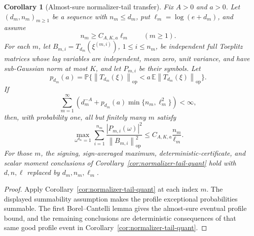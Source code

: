 \documentclass[11pt]{amsart}
\numberwithin{equation}{section}
\newtheorem{corollary}[theorem]{Corollary}
\theoremstyle{definition}
\theoremstyle{remark}
\newcommand{\op}{\mathrm{op}}
\newcommand{\Prob}{\mathbb P}
\newcommand{\Exp}{\mathbb E}
\newcommand{\norm}[1]{\left\lVert #1\right\rVert}
\newcommand{\abs}[1]{\left\lvert #1\right\rvert}
\begin{document}
\begin{corollary}[Almost-sure normalizer-tail transfer]
\label{cor:normalizer-tail-borel}
Fix \(A>0\) and \(a>0\).  Let \((d_m,n_m)_{m\ge1}\) be a sequence with
\(n_m\le d_m\), put \(\ell_m=\log(e+d_m)\), and assume
\[
  n_m\ge C_{A,K,a}\ell_m
  \qquad(m\ge1).
\]
For each \(m\), let \(B_{m,i}=T_{d_m}(\xi^{(m,i)})\), \(1\le i\le n_m\), be
independent full Toeplitz matrices whose lag variables are independent, mean
zero, unit variance, and have sub-Gaussian norm at most \(K\), and let
\(P_{m,i}\) be their symbols.  Let
\[
  p_{d_m}(a)
  =\Prob\{\norm{T_{d_m}(\xi)}_{\op}<a\,\Exp\norm{T_{d_m}(\xi)}_{\op}\}.
\]
If
\[
  \sum_{m=1}^{\infty}
  \left(d_m^{-A}+p_{d_m}(a)\min\{n_m,\ell_m^2\}\right)<\infty,
\]
then, with probability one, all but finitely many \(m\) satisfy
\[
  \max_{\omega^{d_m}=1}
  \sum_{i=1}^{n_m}
  \frac{\abs{P_{m,i}(\omega)}^2}{\norm{B_{m,i}}_{\op}^2}
  \le C_{A,K,a}\frac{n_m}{\ell_m}.
\]
For those \(m\), the signing, sign-averaged maximum, deterministic-certificate,
and scalar moment conclusions of Corollary~\ref{cor:normalizer-tail-quant} hold
with \(d,n,\ell\) replaced by \(d_m,n_m,\ell_m\).
\end{corollary}

\begin{proof}
Apply Corollary~\ref{cor:normalizer-tail-quant} at each index \(m\).  The
displayed summability assumption makes the profile exceptional probabilities
summable.  The first Borel--Cantelli lemma gives the almost-sure eventual
profile bound, and the remaining conclusions are deterministic consequences of
that same good profile event in Corollary~\ref{cor:normalizer-tail-quant}.
\end{proof}
\end{document}
